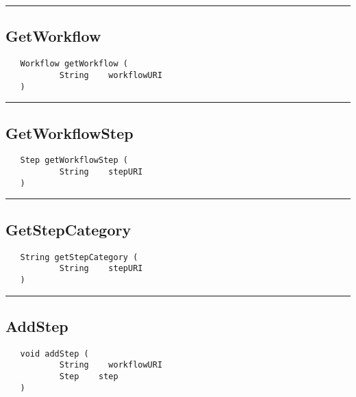 \rule{15cm}{2pt}
\subsection{GetWorkflow}
\label{Api:GetWorkflow}
\begin{verbatim}
   Workflow getWorkflow (
           String    workflowURI
   )
\end{verbatim}



\rule{15cm}{2pt}
\subsection{GetWorkflowStep}
\label{Api:GetWorkflowStep}
\begin{verbatim}
   Step getWorkflowStep (
           String    stepURI
   )
\end{verbatim}



\rule{15cm}{2pt}
\subsection{GetStepCategory}
\label{Api:GetStepCategory}
\begin{verbatim}
   String getStepCategory (
           String    stepURI
   )
\end{verbatim}



\rule{15cm}{2pt}
\subsection{AddStep}
\label{Api:AddStep}
\begin{verbatim}
   void addStep (
           String    workflowURI
           Step    step
   )
\end{verbatim}



